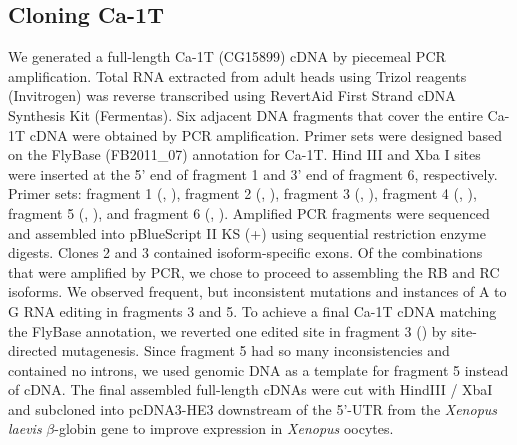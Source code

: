 \subsection*{Cloning Ca-\alpha1T}

We generated a full-length Ca-\alpha1T (CG15899) cDNA by piecemeal PCR amplification.
Total RNA extracted from adult heads using Trizol reagents (Invitrogen) was reverse transcribed using RevertAid First Strand cDNA Synthesis Kit (Fermentas).
Six adjacent DNA fragments that cover the entire Ca-\alpha1T cDNA were obtained by PCR amplification. 
Primer sets were designed based on the FlyBase (FB2011\_07) annotation for Ca-\alpha1T. 
Hind III and Xba I sites were inserted at the 5' end of fragment 1 and 3' end of fragment 6, respectively.
Primer sets: fragment 1 (, ), fragment 2 (, ), fragment 3 (, ), fragment 4 (, ), fragment 5 (, ), and fragment 6 (, ).
Amplified PCR fragments were sequenced and assembled into pBlueScript II KS (+) using sequential restriction enzyme digests.
Clones 2 and 3 contained isoform-specific exons.
Of the combinations that were amplified by PCR, we chose to proceed to assembling the RB and RC isoforms.
We observed frequent, but inconsistent mutations and instances of A to G RNA editing in fragments 3 and 5.
To achieve a final Ca-\alpha1T cDNA matching the FlyBase annotation, we reverted one edited site in fragment 3 () by site-directed mutagenesis.
Since fragment 5 had so many inconsistencies and contained no introns, we used genomic DNA as a template for fragment 5 instead of cDNA.
The final assembled full-length cDNAs were cut with HindIII / XbaI and subcloned into pcDNA3-HE3 downstream of the 5'-UTR from the \emph{Xenopus laevis} $\beta$-globin gene to improve expression in \emph{Xenopus} oocytes.
